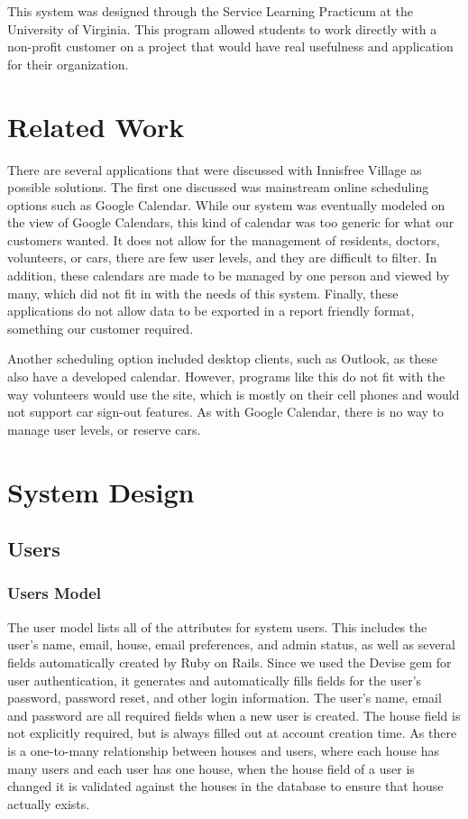 \documentclass{sig-alternate}
\begin{document}
This system was designed through the Service Learning Practicum at the University of Virginia.  This program allowed students to work directly with a non-profit customer on a project that would have real usefulness and application for their organization.  

\section{Related Work}
There are several applications that were discussed with Innisfree Village as possible solutions.  The first one discussed was mainstream online scheduling options such as Google Calendar. While our system was eventually modeled on the view of Google Calendars, this kind of calendar was too generic for what our customers wanted.  It does not allow for the management of residents, doctors, volunteers, or cars, there are few user levels, and they are difficult to filter.  In addition, these calendars are made to be managed by one person and viewed by many, which did not fit in with the needs of this system. Finally, these applications do not allow data to be exported in a report friendly format, something our customer required.
	
Another scheduling option included desktop clients, such as Outlook, as these also have a developed calendar.  However, programs like this do not fit with the way volunteers would use the site, which is mostly on their cell phones and would not support car sign-out features.  As with Google Calendar, there is no way to manage user levels, or reserve cars.

\section{System Design}

\subsection{Users}

\subsubsection{Users Model}
The user model lists all of the attributes for system users. This includes the user’s name, email, house, email preferences, and admin status, as well as several fields automatically created by Ruby on Rails. Since we used the Devise gem \cite{devise} for user authentication, it generates and automatically fills fields for the user's password, password reset, and other login information. The user's name, email and password are all required fields when a new user is created. The house field is not explicitly required, but is always filled out at account creation time. As there is a one-to-many relationship between houses and users, where each house has many users and each user has one house, when the house field of a user is changed it is validated against the houses in the database to ensure that house actually exists.
\end{document}
